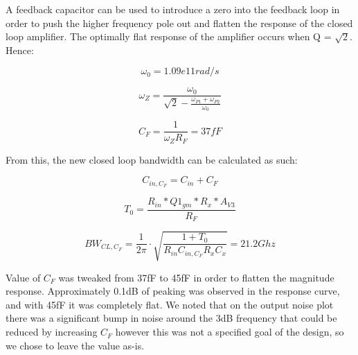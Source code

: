 \documentclass[12pt,a4paper]{article}
\begin{document}

A feedback capacitor can be used to introduce a zero into the feedback loop in
order to push the higher frequency pole out and flatten the response of the
closed loop amplifier. The optimally flat response of the amplifier occurs when Q = $\sqrt{2}$. Hence:

\begin{equation}
  \omega_0 = 1.09e11 rad/s
\end{equation}

\begin{equation}
  \omega_Z = \frac{\omega_{0}}{\sqrt{2} - \frac{\omega_{P1} + \omega_{P2}}{\omega_{0}}}
\end{equation}

\begin{equation}
  C_F = \frac{1}{\omega_Z R_F} = 37fF
\end{equation}

From this, the new closed loop bandwidth can be calculated as such:

\begin{equation}
  C_{in,C_F} = C_{in} + C_F
\end{equation}

\begin{equation}
  T_0 = \frac{R_{in} * Q1_{gm} * R_x * A_{V3}}{R_F}
\end{equation}

\begin{equation}
  BW_{CL,C_F} = \frac{1}{2 \pi} \cdot \sqrt{\frac{1 + T_0}{ R_{in} C_{in,C_F} R_x C_x}} = 21.2Ghz
\end{equation}

Value of $C_F$ was tweaked from 37fF to 45fF in order to flatten the magnitude response. Approximately 0.1dB of peaking was observed in the response curve, and with 45fF it was completely flat. We noted that on the output noise plot there was a significant bump in noise around the 3dB frequency that could be reduced by increasing $C_F$ however this was not a specified goal of the design, so we chose to leave the value as-is.
\pagebreak



\end{document}
